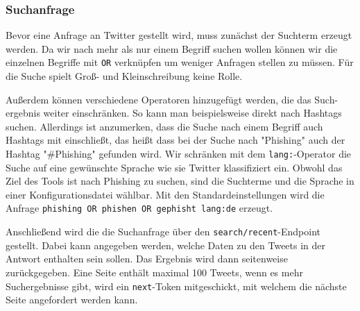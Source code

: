 \documentclass[runningheads]{llncs}
\begin{document}
\subsubsection{Suchanfrage}
Bevor eine Anfrage an Twitter gestellt wird, muss zunächst der Suchterm erzeugt werden.
Da wir nach mehr als nur einem Begriff suchen wollen können wir die einzelnen Begriffe mit \texttt{OR} verknüpfen um weniger Anfragen stellen zu müssen.
Für die Suche spielt Groß- und Kleinschreibung keine Rolle.

Außerdem können verschiedene Operatoren hinzugefügt werden, die das Such-ergebnis weiter einschränken.
So kann man beispielsweise direkt nach Hashtags suchen.
Allerdings ist anzumerken, dass die Suche nach einem Begriff auch Hashtags mit einschließt, das heißt dass bei der Suche nach "Phishing" auch der Hashtag "\#Phishing" gefunden wird.
Wir schränken mit dem \texttt{lang:}-Operator die Suche auf eine gewünschte Sprache wie sie Twitter klassifiziert ein.
Obwohl das Ziel des Tools ist nach Phishing zu suchen, sind die Suchterme und die Sprache in einer Konfigurationsdatei wählbar.
Mit den Standardeinstellungen wird die Anfrage \texttt{phishing OR phishen OR gephisht lang:de} erzeugt.

Anschließend wird die die Suchanfrage über den \texttt{search/recent}-Endpoint gestellt.
Dabei kann angegeben werden, welche Daten zu den Tweets in der Antwort enthalten sein sollen.
Das Ergebnis wird dann seitenweise zurückgegeben.
Eine Seite enthält maximal 100 Tweets, wenn es mehr Suchergebnisse gibt, wird ein \texttt{next}-Token mitgeschickt, mit welchem die nächste Seite angefordert werden kann.
\end{document}
